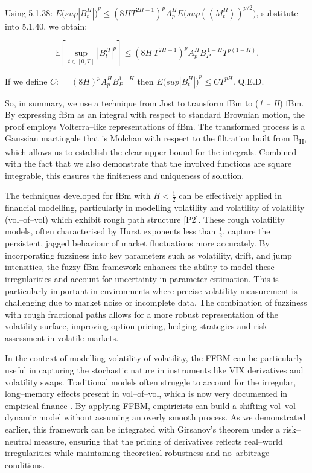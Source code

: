 \documentclass[12pt,a4paper]{report}
\numberwithin{equation}{section}
\begin{document}
Using 5.1.38:
\({{E(sup}\left| B_{t}^{H} \right|)}^{p} \leq {(8HT^{2H - 1})}^{p}{A_{p}^{H}E(sup}{{(\left\langle M_{t}^{H} \right\rangle)}^{p/2})}\),
substitute into 5.1.40, we obtain:

\begin{equation}\tag{5.1.41}
\mathbb{E}\!\left[\sup_{t\in[0,T]}|B_t^{H}|^{p}\right]
\le \left(8H\,T^{2H-1}\right)^{p} A_{p}^{H} B_{P}^{\,1-H} T^{p(1-H)} .
\end{equation}


If we define \(C: = {(8H)}^{p}A_{p}^{H}B_{P}^{1 - H}\) then
\({{E(sup}\left| B_{t}^{H} \right|)}^{p} \leq CT^{pH}\). Q.E.D.

So, in summary, we use a technique from Jost \cite{jost2006transformation_108} to transform fBm
to (\emph{1 -- H}) fBm. By expressing fBm as an integral with respect to
standard Brownian motion, the proof employs Volterra--like
representations of fBm. The transformed process is a Gaussian martingale
that is Molchan with respect to the filtration built from
B\textsubscript{H}, which allows us to establish the
clear upper bound for the integrals. Combined with the
fact that we also demonstrate that the involved functions are square
integrable, this ensures the finiteness and uniqueness of solution.

The techniques developed for fBm with \emph{H} \textless{} $\frac{1}{2}$ can be
effectively applied in financial modelling, particularly in modelling
volatility and volatility of volatility (vol--of--vol) which exhibit rough
path structure \cite{gatheral2014volatility_3} [P2]. These rough volatility models, often
characterised by Hurst exponents less than $\frac{1}{2}$, capture the persistent,
jagged behaviour of market fluctuations more accurately. By
incorporating fuzziness into key parameters such as volatility, drift,
and jump intensities, the fuzzy fBm framework enhances the ability to
model these irregularities and account for uncertainty in parameter
estimation. This is particularly important in environments where precise
volatility measurement is challenging due to market noise or incomplete
data. The combination of fuzziness with rough fractional paths allows
for a more robust representation of the volatility surface, improving
option pricing, hedging strategies and risk assessment in volatile
markets.

In the context of modelling volatility of volatility, the FFBM can be
particularly useful in capturing the stochastic nature in instruments
like VIX derivatives and volatility swaps. Traditional models often
struggle to account for the irregular, long--memory effects present in
vol--of--vol, which is now very documented in empirical finance \cite{gatheral2014volatility_3}.
By applying FFBM, empiricists can build a shifting vol--vol dynamic model
without assuming an overly smooth process. As we demonstrated earlier,
this framework can be integrated with Girsanov's theorem under a
risk--neutral measure, ensuring that the pricing of derivatives reflects
real--world irregularities while maintaining theoretical robustness and
no--arbitrage conditions.
\end{document}
